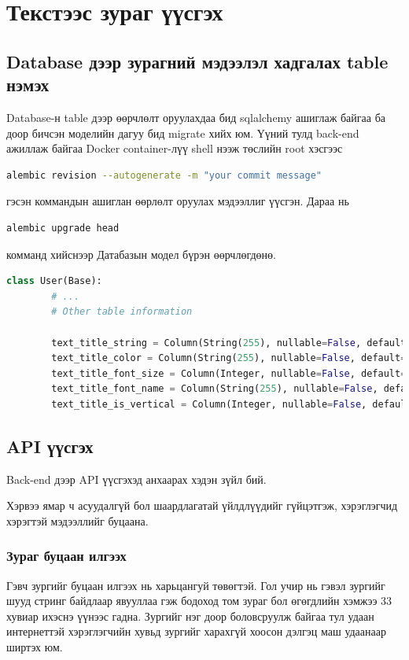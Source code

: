 \section{Текстээс зураг үүсгэх}
\subsection{Database дээр зурагний мэдээлэл хадгалах table нэмэх}
Database-н table дээр өөрчлөлт оруулахдаа бид sqlalchemy ашиглаж байгаа ба доор бичсэн моделийн дагуу бид migrate хийх юм. Үүний тулд back-end ажиллаж байгаа Docker container-лүү shell нээж төслийн root хэсгээс
\begin{lstlisting}[language=bash]
	alembic revision --autogenerate -m "your commit message"
\end{lstlisting}
гэсэн коммандын ашиглан өөрлөлт оруулах мэдээллиг үүсгэн. Дараа нь
\begin{lstlisting}[language=bash]
	alembic upgrade head
\end{lstlisting}
комманд хийснээр Датабазын модел бүрэн өөрчлөгдөнө.

\begin{lstlisting}[language=Python,caption={Table-рүү оруулсан өөрчлөлт},frame=single]
	class User(Base):
		# ...
		# Other table information

		text_title_string = Column(String(255), nullable=False, default="")
		text_title_color = Column(String(255), nullable=False, default="#000000")
		text_title_font_size = Column(Integer, nullable=False, default=0)
		text_title_font_name = Column(String(255), nullable=False, default="")
		text_title_is_vertical = Column(Integer, nullable=False, default=0)
	\end{lstlisting}

\subsection{API үүсгэх}
Back-end дээр API үүсгэхэд анхаарах хэдэн зүйл бий.

Хэрвээ ямар ч асуудалгүй бол шаардлагатай үйлдлүүдийг гүйцэтгэж, хэрэглэгчид хэрэгтэй мэдээллийг буцаана.
\subsubsection{Зураг буцаан илгээх}
Гэвч зургийг буцаан илгээх нь харьцангуй төвөгтэй. Гол учир нь гэвэл зургийг шууд стринг байдлаар явууллаа гэж бодоход том зураг бол өгөгдлийн хэмжээ 33 хувиар ихэснэ үүнээс гадна. Зургийг нэг доор боловсруулж байгаа тул удаан интернеттэй хэрэглэгчийн хувьд зургийг харахгүй хоосон дэлгэц маш удаанаар ширтэх юм.

